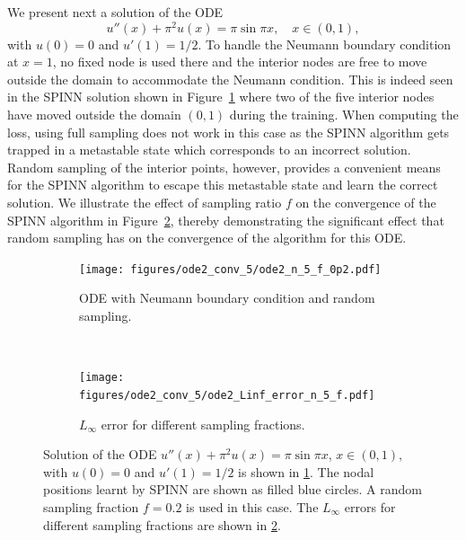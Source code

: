 \documentclass[12pt]{article}
\begin{document}
We present next a solution of the ODE
\begin{displaymath}
u''(x) + \pi^2 u(x) = \pi \sin \pi x, \quad x \in (0,1),
\end{displaymath}
with $u(0) = 0$ and $u'(1) = 1/2$. To handle the Neumann boundary condition at $x=1$, no fixed node is used there and the interior nodes are free to move outside the domain to accommodate the Neumann condition. This is indeed seen in the SPINN solution shown in Figure~\ref{fig:ode2_n_5_f_0p2} where two of the five interior nodes have moved outside the domain $(0,1)$ during the training. When computing the loss, using full sampling does not work in this case as the SPINN algorithm gets trapped in a metastable state which corresponds to an incorrect solution. Random sampling of the interior points, however, provides a convenient means for the SPINN algorithm to escape this metastable state and learn the correct solution. We illustrate the effect of sampling ratio $f$ on the convergence of the SPINN algorithm in Figure~\ref{fig:ode2_n_5_Linf}, thereby demonstrating the significant effect that random sampling has on the convergence of the algorithm for this ODE.

\begin{figure}[htpb]
\begin{subfigure}{0.5\textwidth}
\centering
\texttt{[image: figures/ode2\_conv\_5/ode2\_n\_5\_f\_0p2.pdf]}
\caption{ODE with Neumann boundary condition and random sampling.}
\label{fig:ode2_n_5_f_0p2}
\end{subfigure}
~
\begin{subfigure}{0.5\textwidth}
\centering
\texttt{[image: figures/ode2\_conv\_5/ode2\_Linf\_error\_n\_5\_f.pdf]}
\caption{$L_{\infty}$ error for different sampling fractions.}
\label{fig:ode2_n_5_Linf}
\end{subfigure}
\caption{Solution of the ODE $u''(x) + \pi^2 u(x) = \pi \sin \pi x$, $x \in (0,1)$, with $u(0) = 0$ and $u'(1) = 1/2$ is shown in \ref{fig:ode2_n_5_f_0p2}. The nodal positions learnt by SPINN are shown as filled blue circles. A random sampling fraction $f=0.2$ is used in this case. The $L_{\infty}$ errors for different sampling fractions are shown in \ref{fig:ode2_n_5_Linf}.}
\label{fig:spinn_ode_2}
\end{figure}
\end{document}
